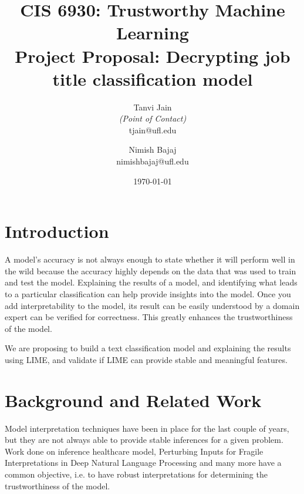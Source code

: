 \documentclass[11pt,letterpaper]{article}
\title{CIS 6930: Trustworthy Machine Learning\\
	\Large Project Proposal: Decrypting job title classification model} %
\author{
        Tanvi Jain \\{\em (Point of Contact)} \\
        tjain@ufl.edu\\
        \and
        Nimish Bajaj \\
        nimishbajaj@ufl.edu\\
}
\date{\today}
\begin{document}

\maketitle




\section{Introduction}



A model's accuracy is not always enough to state whether it will perform well in the wild because the accuracy highly depends on the data that was used to train and test the model. 
Explaining the results of a model, and identifying what leads to a particular classification can help provide insights into the model.
Once you add interpretability to the model, its result can be easily understood by a domain expert can be verified for correctness. This greatly enhances the trustworthiness of the model.


We are proposing to build a text classification model and explaining the results using LIME, and validate if LIME can provide stable and meaningful features. 


\section{Background and Related Work}

Model interpretation techniques have been in place for the last couple of years, but they are not always able to provide stable inferences for a given problem. 
Work done on inference healthcare model\cite{Rasheed2021}, Perturbing Inputs for Fragile Interpretations in Deep Natural Language Processing \cite{sinha2021perturbing} and many more have a common objective, i.e. to have robust interpretations for determining the trustworthiness of the model.
\end{document}
